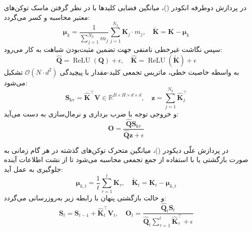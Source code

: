 در پردازش دوطرفه انکودر ()، میانگین فضایی کلیدها با در نظر گرفتن ماسک توکن‌های معتبر محاسبه و کسر می‌گردد:
\begin{equation}
\boldsymbol{\mu}_k = \frac{1}{\sum_{j=1}^{N_k} m_j} \sum_{j=1}^{N_k} \mathbf{K}_j \cdot m_j, \quad \tilde{\mathbf{K}} = \mathbf{K} - \boldsymbol{\mu}_k
\end{equation}
سپس نگاشت غیرخطی نامنفی جهت تضمین مثبت‌بودن شباهت به کار می‌رود:
\begin{equation}
\hat{\mathbf{Q}} = \operatorname{ReLU}(\mathbf{Q}) + \epsilon, \quad \hat{\mathbf{K}} = \operatorname{ReLU}(\tilde{\mathbf{K}}) + \epsilon
\end{equation}
به واسطه خاصیت خطی، ماتریس تجمعی کلید-مقدار با پیچیدگی $\mathcal{O}(N \cdot d^2)$ تشکیل می‌شود:
\begin{equation}
\mathbf{S}_{\text{kv}} = \hat{\mathbf{K}}^\top \mathbf{V} \in \mathbb{R}^{B \times H \times d \times d}, \quad \mathbf{z} = \sum_{j=1}^{N_k} \hat{\mathbf{K}}_j^\top
\end{equation}
و خروجی توجه با ضرب برداری و نرمال‌سازی به دست می‌آید:
\begin{equation}
\mathbf{O} = \frac{\hat{\mathbf{Q}} \mathbf{S}_{\text{kv}}}{\hat{\mathbf{Q}} \mathbf{z} + \epsilon}
\end{equation}

در پردازش علّی دیکودر ()، میانگین متحرک توکن‌های گذشته در هر گام زمانی به صورت بازگشتی یا با استفاده از جمع تجمعی محاسبه می‌شود تا از نشت اطلاعات آینده جلوگیری به عمل آید:
\begin{equation}
\boldsymbol{\mu}_{k, t} = \frac{1}{t} \sum_{\tau=1}^t \mathbf{K}_\tau, \quad \tilde{\mathbf{K}}_t = \mathbf{K}_t - \boldsymbol{\mu}_{k, t}
\end{equation}
و حالت بازگشتی پنهان با رابطه زیر به‌روزرسانی می‌گردد:
\begin{equation}
\mathbf{S}_t = \mathbf{S}_{t-1} + \hat{\mathbf{K}}_t^\top \mathbf{V}_t, \quad \mathbf{O}_t = \frac{\hat{\mathbf{Q}}_t \mathbf{S}_t}{\hat{\mathbf{Q}}_t \sum_{\tau=1}^t \hat{\mathbf{K}}_\tau^\top + \epsilon}
\end{equation}

